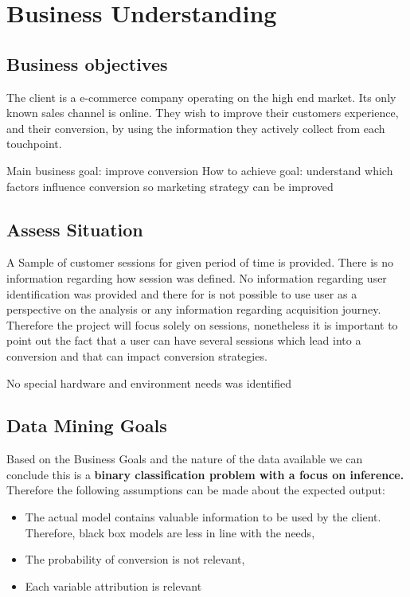 \documentclass[
]{book}
\providecommand{\tightlist}{%
  \setlength{\itemsep}{0pt}\setlength{\parskip}{0pt}}
\begin{document}
\hypertarget{business-understanding}{%
\chapter{Business Understanding}\label{business-understanding}}

\hypertarget{business-objectives}{%
\section{Business objectives}\label{business-objectives}}

The client is a e-commerce company operating on the high end market. Its only known sales channel is online. They wish to improve their customers experience, and their conversion, by using the information they actively collect from each touchpoint.

Main business goal: improve conversion
How to achieve goal: understand which factors influence conversion so marketing strategy can be improved

\hypertarget{assess-situation}{%
\section{Assess Situation}\label{assess-situation}}

A Sample of customer sessions for given period of time is provided.
There is no information regarding how session was defined.
No information regarding user identification was provided and there for is not possible to use user as a perspective on the analysis or any information regarding acquisition journey. Therefore the project will focus solely on sessions, nonetheless it is important to point out the fact that a user can have several sessions which lead into a conversion and that can impact conversion strategies.

No special hardware and environment needs was identified

\hypertarget{data-mining-goals}{%
\section{Data Mining Goals}\label{data-mining-goals}}

Based on the Business Goals and the nature of the data available we can conclude this is a \textbf{binary classification problem with a focus on inference.} Therefore the following assumptions can be made about the expected output:

\begin{itemize}
\tightlist
\item
  The actual model contains valuable information to be used by the client. Therefore, black box models are less in line with the needs,
\item
  The probability of conversion is not relevant,
\item
  Each variable attribution is relevant
\end{itemize}
\end{document}
